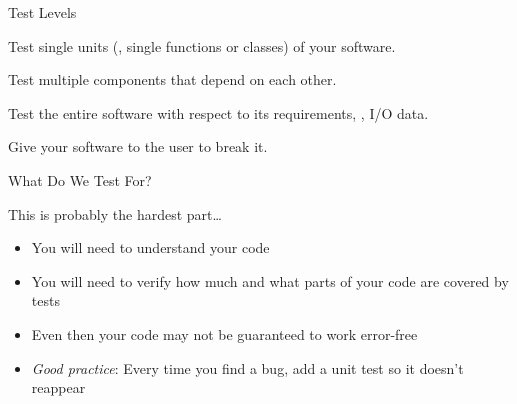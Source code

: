 \begin{frame}{Test Levels}
  \begin{description}
    \setlength{\itemsep}{1em}
    \item [Unit Testing] Test single units (\ie, single functions or classes) of your software.
    \item [Integration Testing] Test multiple components that depend on each other.
    \item [System Testing] Test the entire software with respect to its requirements, \eg, I/O data.
    \item [Operational Acceptance Testing] Give your software to the user to break it.
  \end{description}
  \vspace{0.5cm}
\end{frame}

\begin{frame}{What Do We Test For?}
  \begin{center}
    \huge\textcolor{ccyan}{This is probably the hardest part\dots}
  \end{center}
  \begin{itemize}
    \setlength{\itemsep}{1em}
    \item You will need to understand your code
    \item You will need to verify how much and what parts of your code are covered by tests
    \item Even then your code may not be guaranteed to work error-free
    \item \emph{Good practice}: Every time you find a bug, add a unit test so it doesn't reappear
  \end{itemize}
\end{frame}


